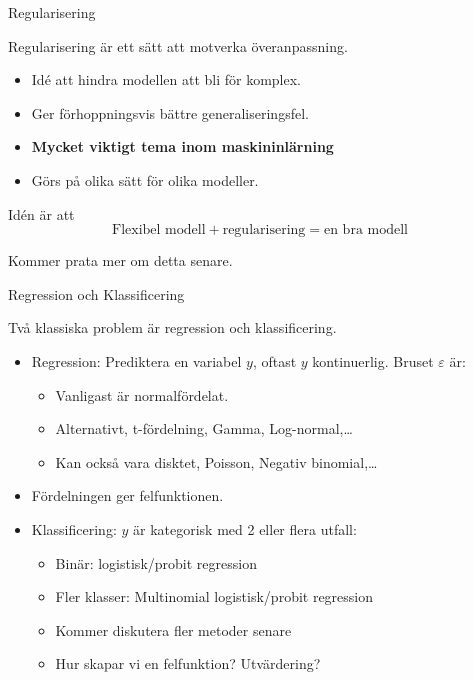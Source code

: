 \documentclass[10pt,english]{beamer}
\begin{document}
\begin{frame}{Regularisering}

    Regularisering är ett sätt att motverka överanpassning.

    \begin{itemize}
        \item Idé att hindra modellen att bli för komplex.
        \item Ger förhoppningsvis bättre generaliseringsfel.
        \item \textbf{Mycket viktigt tema inom maskininlärning}
        \item Görs på olika sätt för olika modeller.
    \end{itemize}

    Idén är att
    \begin{equation*}
        \text{Flexibel modell} + \text{regularisering} = \text{en bra modell}
    \end{equation*}

    Kommer prata mer om detta senare.

\end{frame}

\begin{frame}{Regression och Klassificering}
    
    Två klassiska problem är regression och klassificering.

    \begin{itemize}
        \item Regression: Prediktera en variabel $y$, oftast $y$ kontinuerlig. Bruset $\varepsilon$ är:
        \begin{itemize}
            \item Vanligast är normalfördelat.
            \item Alternativt, t-fördelning, Gamma, Log-normal,\dots
            \item Kan också vara disktet, Poisson, Negativ binomial,\dots
        \end{itemize}
        \item Fördelningen ger felfunktionen.
        \item Klassificering: $y$ är kategorisk med 2 eller flera utfall:
        \begin{itemize}
            \item Binär: logistisk/probit regression
            \item Fler klasser: Multinomial logistisk/probit regression
            \item Kommer diskutera fler metoder senare
            \item Hur skapar vi en felfunktion? Utvärdering?
        \end{itemize}
    \end{itemize}

\end{frame}
\end{document}
